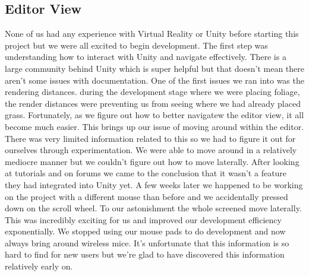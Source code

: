 \documentclass[10pt,journal,compsoc,onecolumn, draftclsnofoot]{IEEEtran}
\begin{document}
\subsection{Editor View}
None of us had any experience with Virtual Reality or Unity before starting this project but we were all excited to begin development.
The first step was understanding how to interact with Unity and navigate effectively.
There is a large community behind Unity which is super helpful but that doesn’t mean there aren’t some issues with documentation.
One of the first issues we ran into was the rendering distances.
during the development stage where we were placing foliage, the render distances were preventing us from seeing where we had already placed grass.
Fortunately, as we figure out how to better navigatew the editor view, it all become much easier.
This brings up our issue of moving around within the editor.
There was very limited information related to this so we had to figure it out for ourselves through experimentation.
We were able to move around in a relatively mediocre manner but we couldn’t figure out how to move laterally.
After looking at tutorials and on forums we came to the conclusion that it wasn’t a feature they had integrated into Unity yet.
A few weeks later we happened to be working on the project with a different mouse than before and we accidentally pressed down on the scroll wheel.
To our astonishment the whole screened move laterally.
This was incredibly exciting for us and improved our development efficiency exponentially.
We stopped using our mouse pads to do development and now always bring around wireless mice.
It’s unfortunate that this information is so hard to find for new users but we’re glad to have discovered this information relatively early on.
\end{document}

